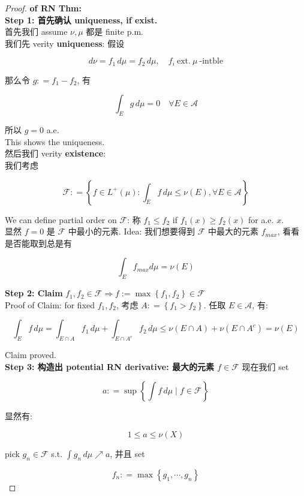 \begin{proof}

\textbf{of RN Thm:}\\
\textbf{Step 1: 首先确认 uniqueness, if exist.}\\
首先我们 assume \(\nu,\mu\) 都是 finite p.m.\\
我们先 verity \textbf{uniqueness}: 假设

\[d\nu = f_{1}\, d\mu = f_{2}\, d\mu,\quad f_{i}\ \text{ext.}\ \mu\ \text{-intble}\]

那么令 \(g: = f_{1} - f_{2}\), 有

\[\int_{E}g\, d\mu = 0\quad\forall E \in \mathcal{A}\]

所以 \(g = 0\) a.e.\\
This shows the uniqueness.\\
然后我们 verity \textbf{existence}:\\
我们考虑

\[\mathcal{F}: = \left\{ {f \in L^{+}(\mu):\int_{E}f\, d\mu \leq \nu(E),\forall E \in \mathcal{A}} \right\}\]

We can define partial order on \(\mathcal{F}\): 称 \(f_{1} \leq f_{2}\) if \(f_{1}(x) \geq f_{2}(x)\) for a.e. \(x\).\\
显然 \(f = 0\) 是 \(\mathcal{F}\) 中最小的元素. Idea: 我们想要得到 \(\mathcal{F}\) 中最大的元素 \(f_{max}\), 看看是否能取到总是有

\[\int_{E}f_{max}d\mu = \nu(E)\]

\textbf{Step 2: Claim} \(f_{1},f_{2} \in \mathcal{F}\Longrightarrow f := \max\left\{ {f_{1},f_{2}} \right\} \in \mathcal{F}\)\\
Proof of Claim: for fixed \(f_{1},f_{2}\), 考虑 \(A: = \left\{ {f_{1} > f_{2}} \right\}\). 任取 \(E \in \mathcal{A}\), 有:

\[\int_{E}f\, d\mu = \int_{E \cap A}f_{1}\, d\mu + \int_{E \cap A^{c}}f_{2}\, d\mu \leq \nu(E \cap A) + \nu(E \cap A^{c}) = \nu(E)\]

Claim proved.\\
\textbf{Step 3: 构造出 potential RN derivative: 最大的元素 \(f \in \mathcal{F}\)} 现在我们 set

\[a: = \sup\left\{ {\int f\, d\mu \mid f \in \mathcal{F}} \right\}\]

显然有:

\[1 \leq a \leq \nu(X)\]

pick \(g_{n} \in \mathcal{F}\) s.t. \(\int g_{n}\, d\mu\operatorname{\nearrow }a\), 并且 set

\[f_{n}: = \max\left\{ {g_{1},\cdots,g_{n}} \right\}\]


\end{proof}
